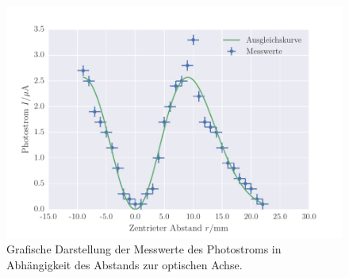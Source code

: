 \begin{figure}[!h]
 \centering
 \includegraphics[scale=0.75]{../Grafiken/TEM_10.pdf}
 \caption{Grafische Darstellung der Messwerte des Photostroms in Abhängigkeit des Abstands zur optischen Achse.\label{fig:tem_10}}
 \end{figure} 